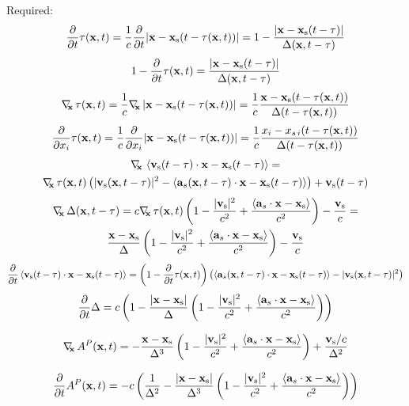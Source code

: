 Required:
\begin{equation}
\frac{\partial}{\partial t} \tau(\mathbf{x},t) = \frac{1}{c}\frac{\partial}{\partial t} |\mathbf{x}-\mathbf{x}_{\mathrm{s}}(t-\tau(\mathbf{x},t))| = 1 - \frac{|\mathbf{x}-\mathbf{x}_{\mathrm{s}}(t-\tau)|}{\Delta(\mathbf{x},t-\tau)}
\end{equation}
\begin{equation}
1-\frac{\partial}{\partial t} \tau(\mathbf{x},t) = \frac{|\mathbf{x}-\mathbf{x}_{\mathrm{s}}(t-\tau)|}{\Delta(\mathbf{x},t-\tau)}
\end{equation}
\begin{equation}
\nabla_{\!\!\mathbf{x}}\, \tau(\mathbf{x},t) = \frac{1}{c} \nabla_{\!\!\mathbf{x}}\, |\mathbf{x}-\mathbf{x}_{\mathrm{s}}(t-\tau(\mathbf{x},t))| = \frac{1}{c} \frac{\mathbf{x} -\mathbf{x}_{\mathrm{s}}(t-\tau(\mathbf{x},t))}{\Delta(t-\tau(\mathbf{x},t))}
\end{equation}
\begin{equation}
\frac{\partial}{\partial x_i} \tau(\mathbf{x},t) = \frac{1}{c}\frac{\partial}{\partial x_i} |\mathbf{x}-\mathbf{x}_{\mathrm{s}}(t-\tau(\mathbf{x},t))| = \frac{1}{c} \frac{x_i -x_{s\, i}(t-\tau(\mathbf{x},t))}{\Delta(t-\tau(\mathbf{x},t))}
\end{equation}
\begin{multline}
\nabla_{\!\!\mathbf{x}}\, \left< \mathbf{v}_{\mathrm{s}}(t-\tau) \cdot \mathbf{x} - \mathbf{x}_{\mathrm{s}}(t-\tau) \right> = \\ \nabla_{\!\!\mathbf{x}}\, \tau(\mathbf{x},t) \left( |\mathbf{v}_{\mathrm{s}}(\mathbf{x},t-\tau)|^2 - \left< \mathbf{a}_s(\mathbf{x},t-\tau) \cdot \mathbf{x} - \mathbf{x}_{\mathrm{s}}(t-\tau) \right> \right) + \mathbf{v}_{\mathrm{s}}(t-\tau)
\end{multline}
\begin{multline}
\nabla_{\!\!\mathbf{x}}\, \Delta(\mathbf{x},t-\tau) =  c \nabla_{\!\!\mathbf{x}}\, \tau(\mathbf{x},t) \left( 1-  \frac{|\mathbf{v}_{\mathrm{s}}|^2}{c^2} + \frac{\left< \mathbf{a}_s \cdot \mathbf{x} - \mathbf{x}_{\mathrm{s}} \right>}{c^2} \right) - \frac{\mathbf{v}_{\mathrm{s}}}{c}
=
\\ \frac{\mathbf{x} -\mathbf{x}_{\mathrm{s}}}{\Delta} \left( 1-  \frac{|\mathbf{v}_{\mathrm{s}}|^2}{c^2} + \frac{\left< \mathbf{a}_s \cdot \mathbf{x} - \mathbf{x}_{\mathrm{s}} \right>}{c^2} \right) - \frac{\mathbf{v}_{\mathrm{s}} }{c}
\end{multline}
\begin{multline}
\frac{\partial}{\partial t	} \left< \mathbf{v}_{\mathrm{s}}(t-\tau) \cdot \mathbf{x} - \mathbf{x}_{\mathrm{s}}(t-\tau) \right> = \left( 1-\frac{\partial}{\partial t} \tau(\mathbf{x},t) \right) \left( \left< \mathbf{a}_s(\mathbf{x},t-\tau) \cdot \mathbf{x} - \mathbf{x}_{\mathrm{s}}(t-\tau) \right> - |\mathbf{v}_{\mathrm{s}}(\mathbf{x},t-\tau)|^2 \right)
\end{multline}
\begin{equation}
\frac{\partial}{\partial t} \Delta = 
c\left( 1-\frac{|\mathbf{x}-\mathbf{x}_{\mathrm{s}}|}{\Delta}
\left(  1-  \frac{|\mathbf{v}_{\mathrm{s}}|^2}{c^2} + \frac{\left< \mathbf{a}_s \cdot \mathbf{x} - \mathbf{x}_{\mathrm{s}} \right>}{c^2} \right)  \right)
\end{equation}


\begin{equation}
\nabla_{\!\!\mathbf{x}}\, A^{P}(\mathbf{x},t) = -\frac{\mathbf{x}-\mathbf{x}_{\mathrm{s}}}{\Delta^3} \left( 1- \frac{|\mathbf{v}_{\mathrm{s}}|^2}{c^2} + \frac{\left< \mathbf{a}_s \cdot \mathbf{x}-\mathbf{x}_{\mathrm{s}} \right>}{c^2}\right)
+\frac{\mathbf{v}_{\mathrm{s}}/c}{\Delta^2}
\end{equation}

\begin{equation}
\frac{\partial}{\partial t} A^{P}(\mathbf{x},t) = -c \left( \frac{1}{\Delta^2} - \frac{|\mathbf{x}-\mathbf{x}_{\mathrm{s}}|}{\Delta^3} \left( 1- \frac{|\mathbf{v}_{\mathrm{s}}|^2}{c^2} + \frac{\left< \mathbf{a}_s \cdot \mathbf{x}-\mathbf{x}_{\mathrm{s}} \right>}{c^2}\right)\right)
\end{equation}
